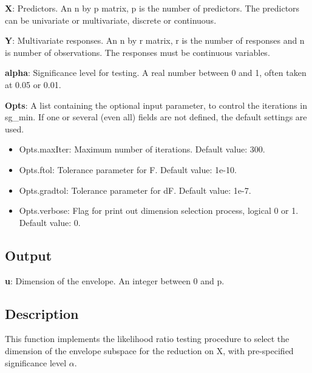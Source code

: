 \documentclass[a4paper,11pt,openany]{memoir}
\begin{document}
\begin{par}
\textbf{X}: Predictors. An n by p matrix, p is the number of predictors. The predictors can be univariate or multivariate, discrete or continuous.
\end{par} \vspace{1em}
\begin{par}
\textbf{Y}: Multivariate responses. An n by r matrix, r is the number of responses and n is number of observations. The responses must be continuous variables.
\end{par} \vspace{1em}
\begin{par}
\textbf{alpha}: Significance level for testing.  A real number between 0 and 1, often taken at 0.05 or 0.01.
\end{par} \vspace{1em}
\begin{par}
\textbf{Opts}: A list containing the optional input parameter, to control the iterations in sg\_min. If one or several (even all) fields are not defined, the default settings are used.
\end{par} \vspace{1em}
\begin{itemize}
\setlength{\itemsep}{-1ex}
   \item Opts.maxIter: Maximum number of iterations.  Default value: 300.
   \item Opts.ftol: Tolerance parameter for F.  Default value: 1e-10.
   \item Opts.gradtol: Tolerance parameter for dF.  Default value: 1e-7.
   \item Opts.verbose: Flag for print out dimension selection process, logical 0 or 1. Default value: 0.
\end{itemize}


\subsection*{Output}

\begin{par}
\textbf{u}: Dimension of the envelope. An integer between 0 and p.
\end{par} \vspace{1em}


\subsection*{Description}

\begin{par}
This function implements the likelihood ratio testing procedure to select the dimension of the envelope subspace for the reduction on X, with pre-specified significance level $\alpha$.
\end{par} \vspace{1em}
\end{document}
